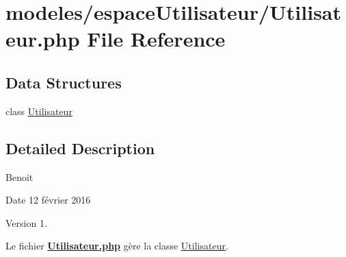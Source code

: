 \hypertarget{_utilisateur_8php}{}\section{modeles/espace\+Utilisateur/\+Utilisateur.php File Reference}
\label{_utilisateur_8php}
\subsection*{Data Structures}
\begin{DoxyCompactItemize}
\item 
class \hyperlink{class_utilisateur}{Utilisateur}
\end{DoxyCompactItemize}


\subsection{Detailed Description}
Benoit \begin{DoxyDate}{Date}
12 février 2016 
\end{DoxyDate}
\begin{DoxyVersion}{Version}
1.
\end{DoxyVersion}
Le fichier {\bfseries \hyperlink{_utilisateur_8php}{Utilisateur.\+php}} gère la classe \hyperlink{class_utilisateur}{Utilisateur}. 